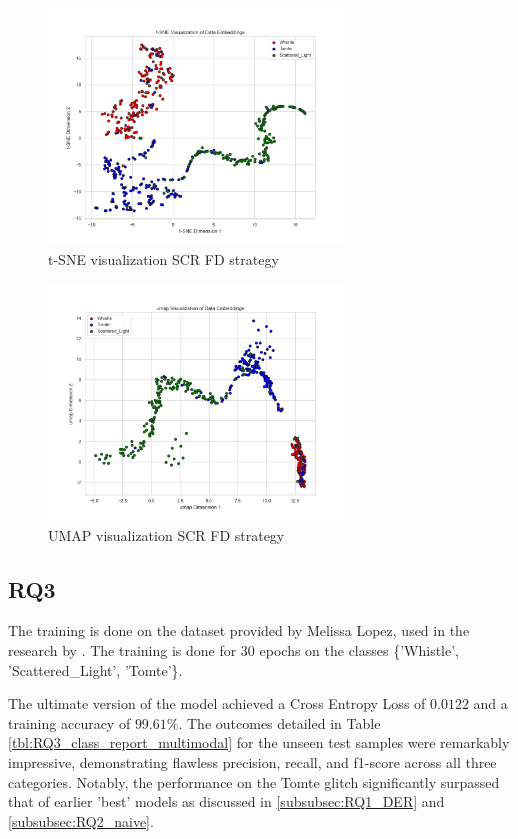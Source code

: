 \begin{figure}[H]
    \centering
    \includegraphics[width=0.7\textwidth]{Images/tSNE_FractalDimension_SCR_test.png}
    \caption{t-SNE visualization SCR FD strategy}
    \label{fig:tsne_FD_SCR}
\end{figure}

\begin{figure}[H]
    \centering
    \includegraphics[width=0.7\textwidth]{Images/umap_FractalDimension_SCR_test.png}
    \caption{UMAP visualization SCR FD strategy}
    \label{fig:umap_FD_SCR}
\end{figure}
\newpage

\subsection{RQ3}
\label{subsub:rq3}
The training is done on the dataset provided by Melissa Lopez, used in the research by \citep{laguarta2023detection, dooney2022dvgan, dooney2024cdvgan}. The training is done for 30 epochs on the classes \{'Whistle', 'Scattered\_Light', 'Tomte'\}. 

The ultimate version of the model achieved a Cross Entropy Loss of $0.0122$ and a training accuracy of $99.61\%$. The outcomes detailed in Table \ref{tbl:RQ3_class_report_multimodal} for the unseen test samples were remarkably impressive, demonstrating flawless precision, recall, and f1-score across all three categories. Notably, the performance on the Tomte glitch significantly surpassed that of earlier 'best' models as discussed in \ref{subsubsec:RQ1_DER} and \ref{subsubsec:RQ2_naive}.

